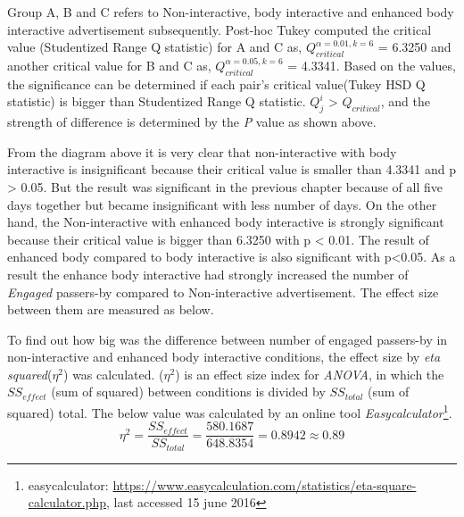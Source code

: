 \begin{enumerate}
\begin{table}[H]
\caption{Post-Hoc Tukey’s HSD}
\label{tab:engage-non-posthoctukey}
\centering
{}
\end{table}


Group A, B and C refers to Non-interactive, body interactive and enhanced body interactive advertisement subsequently. Post-hoc Tukey computed the critical value (Studentized Range Q statistic) for A and C as, ${Q}_{critical}^{\alpha=0.01,k=6}$ = 6.3250 and another critical value for B and C as, ${Q}_{critical}^{\alpha=0.05,k=6}$ = 4.3341. Based on the values, the significance can be determined if each pair’s critical value(Tukey HSD Q statistic) is bigger than Studentized Range Q statistic. ${Q}_{j}^{i }$ > ${Q}_{critical}$, and the strength of difference is determined by the \emph{P} value as shown above. 

From the diagram above it is very clear that non-interactive with body interactive is insignificant because their critical value is smaller than 4.3341 and p > 0.05. But the result was significant in the previous chapter because of all five days together but became insignificant with less number of days. On the other hand, the Non-interactive with enhanced body interactive is strongly significant because their critical value is bigger than 6.3250 with p < 0.01. The result of enhanced body compared to body interactive is also significant with p<0.05. As a result the enhance body interactive had strongly increased the number of \emph{Engaged} passers-by compared to Non-interactive advertisement. The effect size between them are measured as below.

To find out how big was the difference between number of engaged passers-by in non-interactive and enhanced body interactive conditions, the effect size by \emph{eta squared}(${\eta}^2$) was calculated. (${\eta}^2$) is an effect size index for \emph{ANOVA}, in which the $SS_{effect}$ (sum of squared) between conditions is divided by $SS_{total}$  (sum of squared) total. The below value was calculated by an online tool \emph{Easycalculator}\footnote{easycalculator: \url{https://www.easycalculation.com/statistics/eta-square-calculator.php}, last accessed 15 june 2016}.
\[
{\eta}^2 = \frac{{SS}_{effect}}{{SS}_{total}} = \frac{580.1687}{648.8354} = 0.8942\approx 0.89
\]


\end{enumerate}
